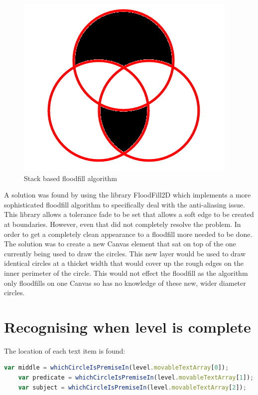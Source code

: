 \documentclass[12pt,a4paper]{report}
\begin{document}
\begin{figure}[h]
\centering
    \includegraphics[scale=0.5]{floodFillBad}
    \caption{Stack based floodfill algorithm}
    \label{fig:floodFillBad}
\end{figure}
\FloatBarrier

	A solution was found by using the library FloodFill2D which implements a more sophisticated floodfill algorithm to specifically deal with the anti-aliasing issue. This library allows a tolerance fade to be set that allows a soft edge to be created at boundaries. However, even that did not completely resolve the problem. In order to get a completely clean appearance to a floodfill more needed to be done. The solution was to create a new Canvas element that sat on top of the one currently being used to draw the circles. This new layer would be used to draw identical circles at a thicket width that would cover up the rough edges on the inner perimeter of the circle. This would not effect the floodfill as the algorithm only floodfills on one Canvas so has no knowledge of these new, wider diameter circles.

\section{Recognising when level is complete}
The location of each text item is found:
\begin{lstlisting}[language=JavaScript]
    var middle = whichCircleIsPremiseIn(level.movableTextArray[0]);
    var predicate = whichCircleIsPremiseIn(level.movableTextArray[1]);
    var subject = whichCircleIsPremiseIn(level.movableTextArray[2]);
\end{lstlisting}
\end{document}
